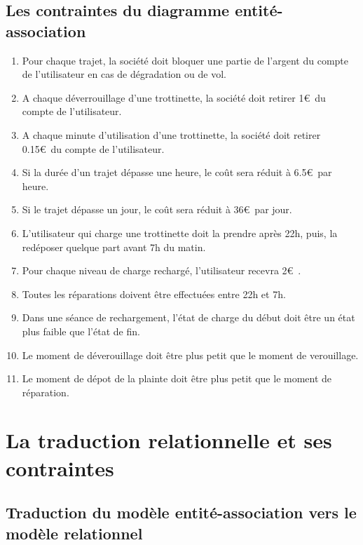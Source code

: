 \documentclass{article}
\begin{document}
     \subsection{Les contraintes du diagramme entité-association}
        \begin{enumerate}
            \item {Pour chaque trajet, la société doit bloquer une partie de l'argent du compte de l'utilisateur en cas de dégradation ou de vol.}
            \item {A chaque déverrouillage d'une trottinette, la société doit retirer 1\euro\ du compte de l'utilisateur.}   
            \item {A chaque minute d'utilisation d'une trottinette, la société doit retirer 0.15\euro\ du compte de l'utilisateur.}
            \item {Si la durée d'un trajet dépasse une heure, le coût sera réduit à 6.5\euro\ par heure.}
            \item {Si le trajet dépasse un jour, le coût sera réduit à 36\euro\ par jour.}
            \item {L'utilisateur qui charge une trottinette doit la prendre après 22h, puis, la redéposer quelque part avant 7h du matin.}
            \item {Pour chaque niveau de charge rechargé, l'utilisateur recevra 2\euro\ .}
            \item {Toutes les réparations doivent être effectuées entre 22h et 7h.}
            \item {Dans une séance de rechargement, l'état de charge du début doit être un état plus faible que l'état de fin.}
            \item{Le moment de déverouillage doit être plus petit que le moment de verouillage.}
            \item{Le moment de dépot de la plainte doit être plus petit que le moment de réparation.}
        \end{enumerate}


\section{La traduction relationnelle et ses contraintes}
    \subsection{Traduction du modèle entité-association vers le modèle relationnel}
\end{document}
